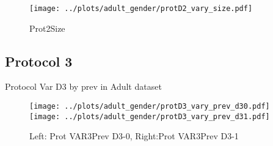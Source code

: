 \documentclass[10pt,a4paper]{article}
\begin{document}
\begin{figure}[h!]
\center
\texttt{[image: ../plots/adult\_gender/protD2\_vary\_size.pdf]}
\caption{Prot2Size}
\end{figure}

\clearpage
\newpage
\subsection{Protocol 3}

\begin{table}[h!]

\caption{Protocol Var D3 by prev in Adult dataset}
\end{table}

\begin{figure}[h!]
\texttt{[image: ../plots/adult\_gender/protD3\_vary\_prev\_d30.pdf]}
\texttt{[image: ../plots/adult\_gender/protD3\_vary\_prev\_d31.pdf]}
\caption{Left: Prot VAR3Prev D3-0, Right:Prot VAR3Prev D3-1}
\end{figure}
\end{document}
